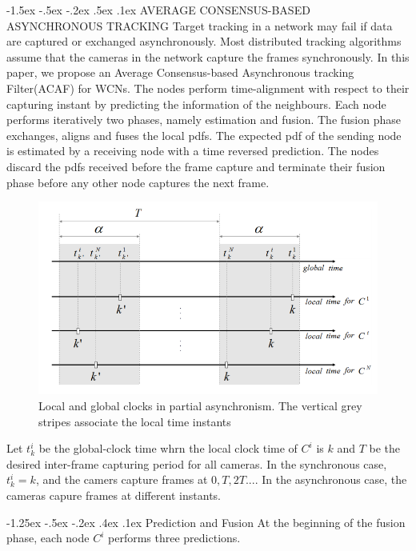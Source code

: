 \documentclass[a4paper, 11pt]{article}
\makeatletter
\newcommand{\sihao}{\fontsize{14pt}{\baselineskip}\selectfont}
\newcommand{\xiaosihao}{\fontsize{12pt}{\baselineskip}\selectfont}
\renewcommand\section{\@startsection{section}{1}{\z@}%
{-1.5ex \@plus -.5ex \@minus -.2ex}%
{.5ex \@plus .1ex}%
{\normalfont\sihao\CJKfamily{hei}}}
\renewcommand\subsection{\@startsection{subsection}{1}{\z@}%
{-1.25ex \@plus -.5ex \@minus -.2ex}%
{.4ex \@plus .1ex}%
{\normalfont\xiaosihao\CJKfamily{hei}}}
\makeatother
\begin{document}
\begin{CJK}{UTF8}{gbsn}
\newpage
\tableofcontents
\newpage

\section{AVERAGE CONSENSUS-BASED ASYNCHRONOUS TRACKING}
Target tracking in a network may fail if data are captured or exchanged asynchronously. Most distributed tracking algorithms assume that the cameras in the network capture the frames synchronously. In this paper, we propose an Average Consensus-based Asynchronous tracking Filter(ACAF) for WCNs. The nodes perform time-alignment with respect to their capturing instant by predicting the information of the neighbours. Each node performs iteratively two phases, namely estimation and fusion. The fusion phase exchanges, aligns and fuses the local pdfs. The expected pdf of the sending node is estimated by a receiving node with a time reversed prediction. The nodes discard the pdfs received before the frame capture and terminate their fusion phase before any other node captures the next frame.

\begin{figure}[!htp]
\includegraphics[scale=0.5]{image/07/localandglobalclocks.png}
\caption{Local and global clocks in partial asynchronism. The vertical grey stripes associate the local time instants }
\end{figure}
Let $t_k^i$ be the global-clock time whrn the local clock time of $C^i$ is $k$ and $T$ be the desired inter-frame capturing period for all cameras. In the synchronous case, $t_k^i = k$, and the camers capture frames at $0,T,2T...$. In the asynchronous case, the cameras capure frames at different instants.

\subsection{Prediction and Fusion}
At the beginning of the fusion phase, each node $C^i$ performs three predictions.


\end{CJK}
\end{document}
